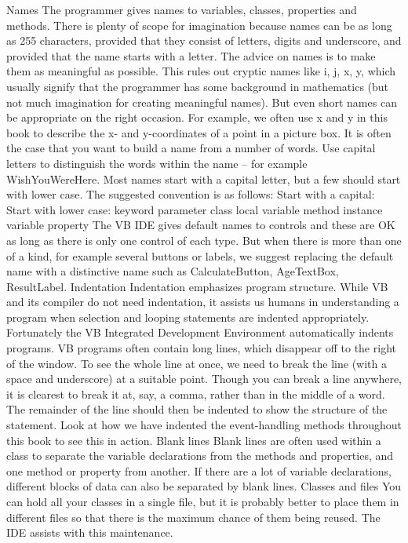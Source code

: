 Names
The programmer gives names to variables, classes, properties and methods. There is plenty of scope for imagination because names can be as long as 255 characters, provided that they consist of letters, digits and underscore, and provided that the name starts with a letter.
The advice on names is to make them as meaningful as possible. This rules out cryptic names like i, j, x, y, which usually signify that the programmer has some background in mathematics (but not much imagination for creating meaningful names). But even short names can be appropriate on the right occasion. For example, we often use x and y in this book to describe the x- and y-coordinates of a point in a picture box.
It is often the case that you want to build a name from a number of words. Use capital letters to distinguish the words within the name – for example WishYouWereHere.
Most names start with a capital letter, but a few should start with lower case. The suggested convention is as follows:
Start with a capital:	Start with lower case:
keyword	parameter
class	local variable
method	instance variable
property
The VB IDE gives default names to controls and these are OK as long as there is only one control of each type. But when there is more than one of a kind, for example 
several buttons or labels, we suggest replacing the default name with a distinctive name such as CalculateButton, AgeTextBox, ResultLabel.
Indentation
Indentation emphasizes program structure. While VB and its compiler do not need indentation, it assists us humans in understanding a program when selection and looping statements are indented appropriately. Fortunately the VB Integrated Development Environment automatically indents programs.
VB programs often contain long lines, which disappear off to the right of the 
window. To see the whole line at once, we need to break the line (with a space and underscore) at a suitable point. Though you can break a line anywhere, it is clearest 
to break it at, say, a comma, rather than in the middle of a word. The remainder of 
the line should then be indented to show the structure of the statement. Look at 
how we have indented the event-handling methods throughout this book to see this 
in action.
Blank lines
Blank lines are often used within a class to separate the variable declarations from 
the methods and properties, and one method or property from another. If there 
are a lot of variable declarations, different blocks of data can also be separated by 
blank lines.
Classes and ﬁles
You can hold all your classes in a single ﬁle, but it is probably better to place them in different ﬁles so that there is the maximum chance of them being reused. The IDE assists with this maintenance.
